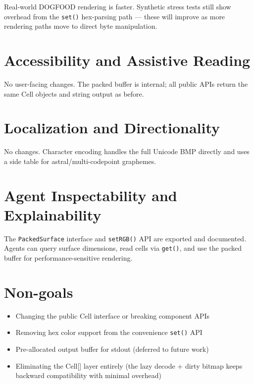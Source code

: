 

Real-world DOGFOOD rendering is faster. Synthetic stress tests still show overhead from the \texttt{s\allowbreak{}e\allowbreak{}t\allowbreak{}(\allowbreak{})} hex-parsing path --- these will improve as more rendering paths move to direct byte manipulation.

\section{Accessibility and Assistive Reading}\label{record-250-accessibility-and-assistive-reading}

No user-facing changes. The packed buffer is internal; all public APIs return the same Cell objects and string output as before.

\section{Localization and Directionality}\label{record-250-localization-and-directionality}

No changes. Character encoding handles the full Unicode BMP directly and uses a side table for astral/multi-codepoint graphemes.

\section{Agent Inspectability and Explainability}\label{record-250-agent-inspectability-and-explainability}

The \texttt{P\allowbreak{}a\allowbreak{}c\allowbreak{}k\allowbreak{}e\allowbreak{}d\allowbreak{}S\allowbreak{}u\allowbreak{}r\allowbreak{}f\allowbreak{}a\allowbreak{}c\allowbreak{}e} interface and \texttt{s\allowbreak{}e\allowbreak{}t\allowbreak{}R\allowbreak{}G\allowbreak{}B\allowbreak{}(\allowbreak{})} API are exported and documented. Agents can query surface dimensions, read cells via \texttt{g\allowbreak{}e\allowbreak{}t\allowbreak{}(\allowbreak{})}, and use the packed buffer for performance-sensitive rendering.

\section{Non-goals}\label{record-250-non-goals}

\begin{itemize}
\tightlist
\item
  Changing the public Cell interface or breaking component APIs
\item
  Removing hex color support from the convenience \texttt{s\allowbreak{}e\allowbreak{}t\allowbreak{}(\allowbreak{})} API
\item
  Pre-allocated output buffer for stdout (deferred to future work)
\item
  Eliminating the Cell{[}{]} layer entirely (the lazy decode + dirty bitmap keeps backward compatibility with minimal overhead)
\end{itemize}

